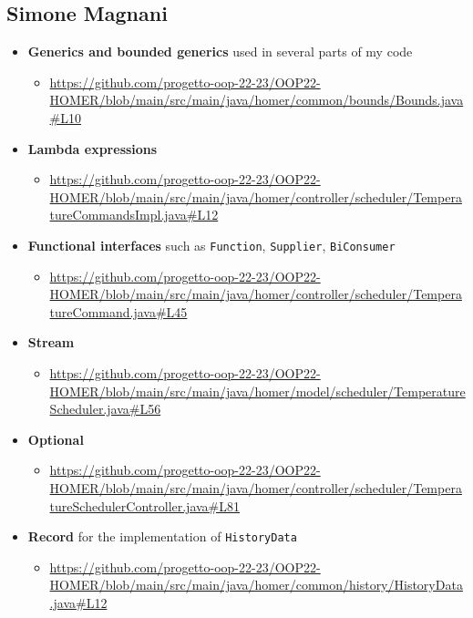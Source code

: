 \subsection{Simone Magnani}

\begin{itemize}
    \item \textbf{Generics and bounded generics} used in several parts of my code
    \begin{itemize}
        \item \url{https://github.com/progetto-oop-22-23/OOP22-HOMER/blob/main/src/main/java/homer/common/bounds/Bounds.java#L10}
    \end{itemize}
    \item \textbf{Lambda expressions}
    \begin{itemize}
        \item \url{https://github.com/progetto-oop-22-23/OOP22-HOMER/blob/main/src/main/java/homer/controller/scheduler/TemperatureCommandsImpl.java#L12}
    \end{itemize}
    \item \textbf{Functional interfaces} such as \texttt{Function}, \texttt{Supplier}, \texttt{BiConsumer}
    \begin{itemize}
        \item \url{https://github.com/progetto-oop-22-23/OOP22-HOMER/blob/main/src/main/java/homer/controller/scheduler/TemperatureCommand.java#L45}
    \end{itemize}
    \item \textbf{Stream}
    \begin{itemize}
        \item \url{https://github.com/progetto-oop-22-23/OOP22-HOMER/blob/main/src/main/java/homer/model/scheduler/TemperatureScheduler.java#L56}
    \end{itemize}
    \item \textbf{Optional}
    \begin{itemize}
        \item \url{https://github.com/progetto-oop-22-23/OOP22-HOMER/blob/main/src/main/java/homer/controller/scheduler/TemperatureSchedulerController.java#L81}
    \end{itemize}
    \item \textbf{Record} for the implementation of \texttt{HistoryData}
    \begin{itemize}
        \item \url{https://github.com/progetto-oop-22-23/OOP22-HOMER/blob/main/src/main/java/homer/common/history/HistoryData.java#L12}

\end{itemize}
\end{itemize}

